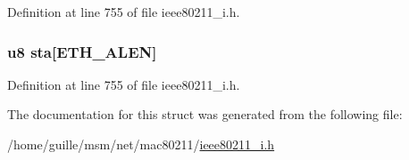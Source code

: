 Definition at line 755 of file ieee80211\-\_\-i.\-h.

\hypertarget{structskb__eosp__msg__data_add1dfd5a29b76978094290db59d1d19c}{
\subsubsection[{sta}]{\setlength{\rightskip}{0pt plus 5cm}u8 sta\mbox{[}E\-T\-H\-\_\-\-A\-L\-E\-N\mbox{]}}}\label{structskb__eosp__msg__data_add1dfd5a29b76978094290db59d1d19c}


Definition at line 755 of file ieee80211\-\_\-i.\-h.



The documentation for this struct was generated from the following file\-:\begin{DoxyCompactItemize}
\item 
/home/guille/msm/net/mac80211/\hyperlink{ieee80211__i_8h}{ieee80211\-\_\-i.\-h}\end{DoxyCompactItemize}
